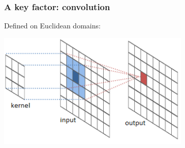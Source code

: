 \documentclass[t,9pt,pdftex]{beamer}
\theoremstyle{definition}
\begin{document}
\begin{frame}[c, label=current]
  \frametitle{A key factor: convolution}
  Defined on Euclidean domains:\\
  \begin{center}
  \includegraphics[width=0.69\textwidth,height=0.69\textheight,keepaspectratio]{conv.png}
  \end{center}
\end{frame}
\end{document}
